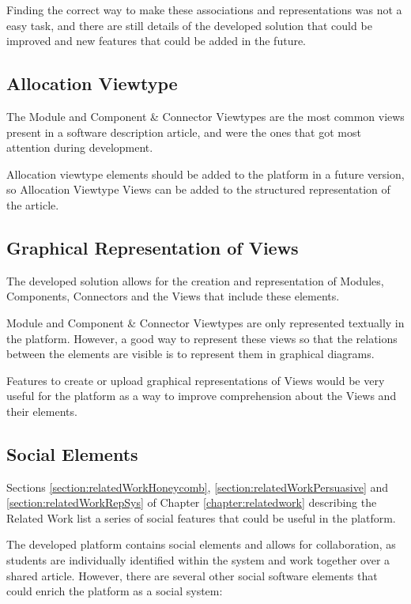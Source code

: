 Finding the correct way to make these associations and representations was not a easy task, and there are still details of the developed solution that could be improved and new features that could be added in the future.

\subsection{Allocation Viewtype}

The Module and Component \& Connector Viewtypes are the most common views present in a software description article, and were the ones that got most attention during development.

Allocation viewtype elements should be added to the platform in a future version, so Allocation Viewtype Views can be added to the structured representation of the article.

\subsection{Graphical Representation of Views}

The developed solution allows for the creation and representation of Modules, Components, Connectors and the Views that include these elements. 

Module and Component \& Connector Viewtypes are only represented textually in the platform. However, a good way to represent these views so that the relations between the elements are visible is to represent them in graphical diagrams. 

Features to create or upload graphical representations of Views would be very useful for the platform as a way to improve comprehension about the Views and their elements.

\subsection{Social Elements}

Sections \ref{section:relatedWorkHoneycomb}, \ref{section:relatedWorkPersuasive} and  \ref{section:relatedWorkRepSys} of Chapter \ref{chapter:relatedwork} describing the Related Work list a series of social features that could be useful in the platform.

The developed platform contains social elements and allows for collaboration, as students are individually identified within the system and work together over a shared article. However, there are several other social software elements that could enrich the platform as a social system:

